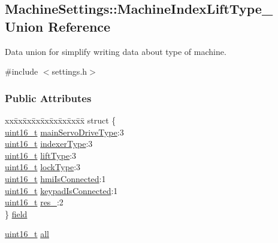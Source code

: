 \hypertarget{unionMachineSettings_1_1MachineIndexLiftType__}{}\subsection{Machine\+Settings\+:\+:Machine\+Index\+Lift\+Type\+\_\+ Union Reference}
\label{unionMachineSettings_1_1MachineIndexLiftType__}

Data union for simplify writing data about type of machine.

{\ttfamily \#include $<$settings.\+h$>$}

\subsubsection*{Public Attributes}
\begin{DoxyCompactItemize}
\item 
\begin{tabbing}
xx\=xx\=xx\=xx\=xx\=xx\=xx\=xx\=xx\=\kill
struct \{\\
\>\mbox{\hyperlink{settings_8h_a017dd44e68049ffdd31500a8cd01ba68}{uint16\_t}} \mbox{\hyperlink{unionMachineSettings_1_1MachineIndexLiftType___ade5becd82bf6e7e9a138dd9f338d8eb5}{mainServoDriveType}}:3\\
\>\mbox{\hyperlink{settings_8h_a017dd44e68049ffdd31500a8cd01ba68}{uint16\_t}} \mbox{\hyperlink{unionMachineSettings_1_1MachineIndexLiftType___a3c933bed3921d7e152f6c2695bcd874a}{indexerType}}:3\\
\>\mbox{\hyperlink{settings_8h_a017dd44e68049ffdd31500a8cd01ba68}{uint16\_t}} \mbox{\hyperlink{unionMachineSettings_1_1MachineIndexLiftType___a3966210fa1071db2ed5b38e6dab5df9d}{liftType}}:3\\
\>\mbox{\hyperlink{settings_8h_a017dd44e68049ffdd31500a8cd01ba68}{uint16\_t}} \mbox{\hyperlink{unionMachineSettings_1_1MachineIndexLiftType___ae87b9995b2369b49d0bf1e15ce92221c}{lockType}}:3\\
\>\mbox{\hyperlink{settings_8h_a017dd44e68049ffdd31500a8cd01ba68}{uint16\_t}} \mbox{\hyperlink{unionMachineSettings_1_1MachineIndexLiftType___af18ae62e8274e1ebaf2638ec1d18daba}{hmiIsConnected}}:1\\
\>\mbox{\hyperlink{settings_8h_a017dd44e68049ffdd31500a8cd01ba68}{uint16\_t}} \mbox{\hyperlink{unionMachineSettings_1_1MachineIndexLiftType___a2bce1af1ba728631a1a852008030e753}{keypadIsConnected}}:1\\
\>\mbox{\hyperlink{settings_8h_a017dd44e68049ffdd31500a8cd01ba68}{uint16\_t}} \mbox{\hyperlink{unionMachineSettings_1_1MachineIndexLiftType___a749a9767d0f734e93c11be50db43eb2f}{res\_}}:2\\
\} \mbox{\hyperlink{unionMachineSettings_1_1MachineIndexLiftType___a9e5a66ac224b280a9011c55ecc59fb9e}{field}}\\

\end{tabbing}\item 
\mbox{\hyperlink{settings_8h_a017dd44e68049ffdd31500a8cd01ba68}{uint16\+\_\+t}} \mbox{\hyperlink{unionMachineSettings_1_1MachineIndexLiftType___a0d52f17b3812bed483d864e9b573ef97}{all}}
\end{DoxyCompactItemize}


